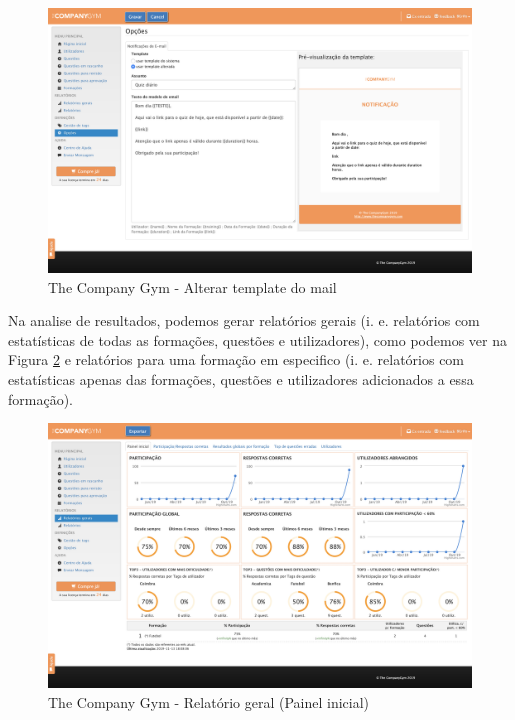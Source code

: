 \begin{figure}[ht!]
	\begin{center}
		\includegraphics[width=1\textwidth]{img/tcg/tcg-mail.png}
		\caption{The Company Gym - Alterar template do mail}
		\label{fig:tcg-mail}
	\end{center}
\end{figure}

\newpage

Na analise de resultados, podemos gerar relatórios gerais (i. e. relatórios com estatísticas de todas as formações, questões e utilizadores), como podemos ver na Figura \ref{fig:tcg-data}  e relatórios para uma formação em especifico (i. e. relatórios com estatísticas apenas das formações, questões e utilizadores adicionados a essa formação). 


\begin{figure}[ht!]
	\begin{center}
		\includegraphics[width=1\textwidth]{img/tcg/tcg-data.png}
		\caption{The Company Gym - Relatório geral (Painel inicial)}
		\label{fig:tcg-data}
	\end{center}
\end{figure}

